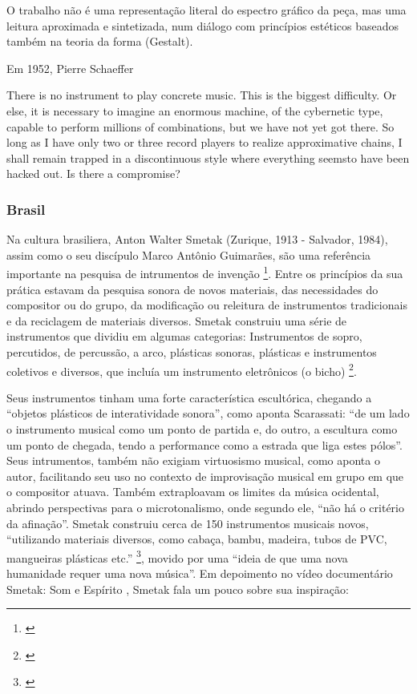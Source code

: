 O trabalho não é uma representação literal do espectro gráfico da peça, mas uma leitura aproximada e sintetizada, num diálogo com princípios estéticos baseados também na teoria da forma (Gestalt).


Em 1952, Pierre Schaeffer 

There is no instrument to play concrete music. This is the biggest difficulty. Or else, it is necessary to imagine an enormous machine, of the cybernetic type, capable to perform millions of combinations, but we have not yet got there. So long as I have only two or three record players to realize approximative chains, I shall remain trapped in a discontinuous style where everything seemsto have been hacked out. Is there a compromise?


\subsubsection{Brasil}
Na cultura brasiliera, Anton Walter Smetak (Zurique, 1913 - Salvador, 1984), assim como o seu discípulo Marco Antônio Guimarães, são uma referência importante na pesquisa de intrumentos de invenção \footnote{\cite{Lima2018, Multimeios2001, Obici2014}}. Entre os princípios da sua prática estavam da pesquisa sonora de novos materiais, das necessidades do compositor ou do grupo, da modificação ou releitura de instrumentos tradicionais e da reciclagem de materiais diversos. Smetak construiu uma série de instrumentos que dividiu em algumas categorias: Instrumentos de sopro, percutidos, de percussão, a arco, plásticas sonoras, plásticas e instrumentos coletivos e diversos, que incluía um instrumento eletrônicos (o bicho) \footnote{\cite{Multimeios2001}}. 

Seus instrumentos tinham uma forte característica escultórica, chegando a ``objetos plásticos de interatividade sonora'', como aponta Scarassati: ``de um lado o instrumento musical como um ponto de partida e, do outro, a escultura como um ponto de chegada, tendo a performance como a estrada que liga estes pólos''. Seus intrumentos, também não exigiam virtuosismo musical, como aponta o autor, facilitando seu uso no contexto de improvisação musical em grupo em que o compositor atuava. Também extraploavam os limites da música ocidental, abrindo perspectivas para o microtonalismo, onde segundo ele, ``não há o critério da afinação''. Smetak construiu cerca de 150 instrumentos musicais novos, ``utilizando materiais diversos, como cabaça, bambu, madeira, tubos de PVC, mangueiras plásticas etc.'' \footnote{\cite{Andres2011}}, movido por uma ``ideia de que uma nova humanidade requer uma nova música''. Em depoimento no vídeo documentário Smetak: Som e Espírito \citeyear{JessicaSmetakPaoli2010}, Smetak fala um pouco sobre sua inspiração:


